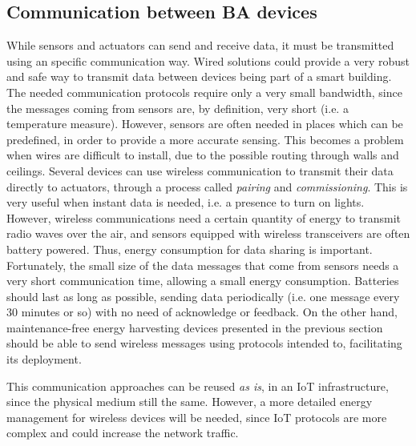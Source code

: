 \subsection{Communication between BA devices}
While sensors and actuators can send and receive data, it must be transmitted using an specific communication way.
Wired solutions could provide a very robust and safe way to transmit data between devices being part of a smart building.
The needed communication protocols require only a very small bandwidth, since the messages coming from sensors are, by definition, very short (i.e. a temperature measure).
However, sensors are often needed in places which can be predefined, in order to provide a more accurate sensing.
This becomes a problem when wires are difficult to install, due to the possible routing through walls and ceilings.
Several devices can use wireless communication to transmit their data directly to actuators, through a process called \textit{pairing} and \textit{commissioning}.
This is very useful when instant data is needed, i.e. a presence to turn on lights.
However, wireless communications need a certain quantity of energy to transmit radio waves over the air, and sensors equipped with wireless transceivers are often battery powered.
Thus, energy consumption for data sharing is important.
Fortunately, the small size of the data messages that come from sensors needs a very short communication time, allowing a small energy consumption.
Batteries should last as long as possible, sending data periodically (i.e. one message every 30 minutes or so) with no need of acknowledge or feedback.
On the other hand, maintenance-free energy harvesting devices presented in the previous section should be able to send wireless messages using protocols intended to, facilitating its deployment.

This communication approaches can be reused \textit{as is}, in an IoT infrastructure, since the physical medium still the same.
However, a more detailed energy management for wireless devices will be needed, since IoT protocols are more complex and could increase the network traffic.

